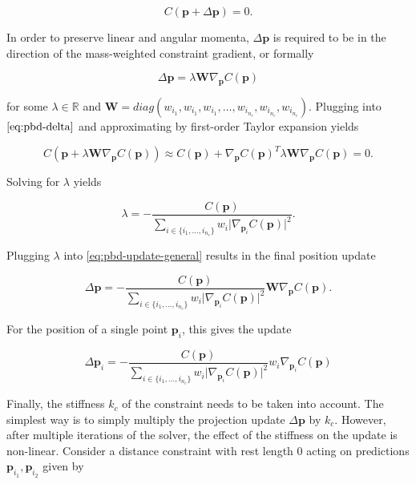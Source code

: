 \begin{equation}\label{eq:pbd-delta}
    C(\bm{p} + \Delta \bm{p}) = 0.
\end{equation}

\noindent In order to preserve linear and angular momenta, $\Delta \bm{p}$ is required to be in the direction of the mass-weighted constraint 
gradient, or formally

\begin{equation}\label{eq:pbd-update-general}
    \Delta \bm{p} = \lambda \bm{W} \nabla_{\bm{p}} C(\bm{p})
\end{equation}

\noindent for some $\lambda \in \mathbb{R}$ and $\bm{W} = diag(w_{i_1}, w_{i_1}, w_{i_1}, \ldots, w_{i_{n_c}}, w_{i_{n_c}}, w_{i_{n_c}})$. 
Plugging into $\cref{eq:pbd-delta}$ and approximating by first-order Taylor expansion yields

\[
    C(\bm{p} + \lambda \bm{W} \nabla_{\bm{p}} C(\bm{p})) \approx C(\bm{p}) + \nabla_{\bm{p}}C(\bm{p})^T \lambda \bm{W}
    \nabla_{\bm{p}}C(\bm{p}) = 0.
\]

\noindent Solving for $\lambda$ yields

\begin{equation}\label{eq:pbd-lambda}
    \lambda = -\frac{C(\bm{p})}{\sum_{i \in \{ i_1, \ldots, i_{n_c} \}} w_i \vert \nabla_{\bm{p}_i}C(\bm{p}) \vert^2 }.
\end{equation}

\noindent Plugging $\lambda$ into \cref{eq:pbd-update-general} results in the final position update

\begin{equation}\label{eq:pbd-update}
    \Delta \bm{p} = -\frac{C(\bm{p})}{\sum_{i \in \{ i_1, \ldots, i_{n_c} \}} w_i \vert \nabla_{\bm{p}_i}C(\bm{p}) \vert^2 } 
    \bm{W}\nabla_{\bm{p}}C(\bm{p}).
\end{equation}

\noindent For the position of a single point $\bm{p}_i$, this gives the update

\begin{equation}\label{eq:pbd-update-individual}
    \Delta \bm{p}_i = -\frac{C(\bm{p})}{\sum_{i \in \{ i_1, \ldots, i_{n_c} \}} w_i \vert \nabla_{\bm{p}_i}C(\bm{p}) \vert^2 } 
    w_i \nabla_{\bm{p}_i} C(\bm{p})
\end{equation}

Finally, the stiffness $k_c$ of the constraint needs to be taken into account. The simplest way is to simply multiply the projection update
$\Delta \bm{p}$ by $k_c$. However, after multiple iterations of the solver, the effect of the stiffness on the update is non-linear. Consider
a distance constraint with rest length 0 acting on predictions $\bm{p}_{i_1}, \bm{p}_{i_2}$ given by

